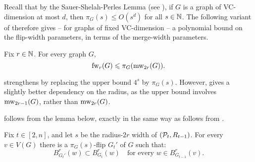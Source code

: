     Recall that by the Sauer-Shelah-Perles Lemma (see ), 
    if $G$ is a graph of VC-dimension at most $d$,
    then $\pi_G(s)\le O(s^d)$ for all $s\in\N$. The following variant of 
     therefore gives -- for graphs of fixed VC-dimension -- a polynomial bound on the flip-width parameters, in terms of the merge-width parameters.

    
    \begin{lemma}\label{lem:fw-poly}Fix $r\in\N$.
        For every graph $G$,  $$\fw_r(G)\le \pi_G(\mw_{2r}(G)).$$
    \end{lemma}
 strengthens 
  by replacing the upper bound $4^s$ by $\pi_G(s)$.
    However,  gives a slightly better dependency on the radius, as the upper bound involves $\mw_{2r-1}(G)$, rather than $\mw_{2r}(G)$.
    
     follows from the lemma below, 
    exactly in the same way as  follows from .
    
    \begin{lemma}\label{lem:strategy-poly}
        Fix $t\in [2,n]$, and 
        let $s$ be the radius-$2r$ width of $(\cal P_t,R_{t-1})$.
        For every $v\in V(G)$ there is a $\pi_G(s)$-flip $G_t'$ of $G$ such that:
    $$B^r_{G_t'}(w)\subset B^r_{G_t}(w)\quad\text{for every $w\in B^r_{G_{t-1}}(v)$.}$$
    \end{lemma}
    
    
    
